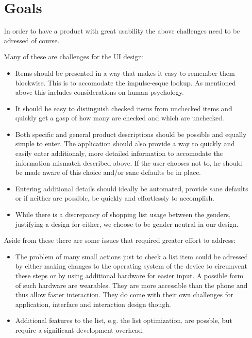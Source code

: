 \documentclass{scrartcl}
\begin{document}
\section{Goals}
\label{sec:goal}
In order to have a product with great usability the above challenges need to be adressed of course.

Many of these are challenges for the UI design:
\begin{itemize}
  \item Items should be presented in a way that makes it easy to remember them blockwise. This is to accomodate the impulse-esque lookup. 
    As mentioned above this includes considerations on human psychology.
  \item It should be easy to distinguish checked items from unchecked items and quickly get a gasp of how many are checked and which are unchecked.
  \item Both specific and general product descriptions should be possible and equally simple to enter. 
    The application should also provide a way to quickly and easily enter additionaly, more detailed information to accomodate the information mismatch described above.
    If the user chooses not to, he should be made aware of this choice and/or sane defaults be in place.
  \item Entering additional details should ideally be automated, provide sane defaults or if neither are possible, be quickly and effortlessly to accomplish.

  \item While there is a discrepancy of shopping list usage between the genders, justifying a design for either, we choose to be gender neutral in our design. 
\end{itemize}

Aside from these there are some issues that required greater effort to address:
\begin{itemize}
  \item The problem of many small actions just to check a list item could be adressed by either making changes to the  operating system of the device to circumvent these steps or by using additional hardware for easier input.
    A possible form of such hardware are wearables. They are more accessible than the phone and thus allow faster interaction. 
    They do come with their own challenges for application, interface and interaction design though.
  \item Additional features to the list, e.g. the list optimization, are possble, but require a significant development overhead. 
\end{itemize}
\end{document}
